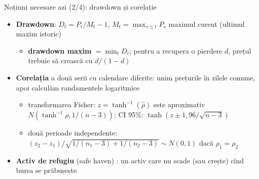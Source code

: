 \begin{frame}{Noțiuni necesare azi (2/4): drawdown și corelație}
\itemsize{\small}
\begin{itemize}
    \item \textbf{Drawdown}: $D_t = P_t/M_t - 1$, $M_t = \max_{s \le t} P_s$ maximul curent (ultimul maxim istoric)
    \begin{itemize}
        \item \textbf{drawdown maxim} $= \min_t D_t$; pentru a recupera o pierdere $d$, prețul trebuie să crească cu $d/(1 - d)$
    \end{itemize}
    \item \textbf{Corelația} a două serii cu calendare diferite: unim prețurile în zilele comune, apoi calculăm randamentele logaritmice
    \begin{itemize}
        \item transformarea Fisher: $z = \tanh^{-1}(\hat\rho)$ este aproximativ $N(\tanh^{-1}\rho, 1/(n - 3))$; CI 95\%: $\tanh(z \pm 1{,}96/\sqrt{n - 3})$
        \item două perioade independente: $(z_2 - z_1)/\sqrt{1/(n_1 - 3) + 1/(n_2 - 3)} \sim N(0, 1)$ dacă $\rho_1 = \rho_2$
    \end{itemize}
    \item \textbf{Activ de refugiu} (safe haven) : un activ care nu scade (sau crește) cînd bursa se prăbușește
\end{itemize}
\end{frame}

